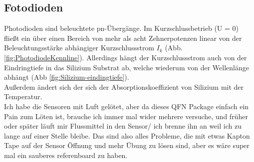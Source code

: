 
\subsection{Fotodioden}
Photodioden sind beleuchtete pn-Übergänge. Im Kurzschlussbetrieb (U = 0) fließt ein über einen Bereich von mehr als acht Zehnerpotenzen linear von der Beleuchtungsstärke abhängiger Kurzschlussstrom $I_k$ (Abb. \ref{fig:PhotodiodeKennline}).
Allerdings hängt der Kurzschlussstrom auch von der Eindringtiefe in das Silizium Substrat ab, welche wiederum von der Wellenlänge abhängt (Abb \ref{fig:Silizium-eindingtiefe}).\\
Außerdem ändert sich der sich der Absorptionskoeffizient von Silizium mit der Temperatur. \\%





Ich habe die Sensoren mit Luft gelötet, aber da dieses QFN Package einfach ein Pain zum Löten ist, brauche ich immer mal wider mehrere versuche, und früher oder später läuft mir Flussmittel in den Sensor/ ich brenne ihn an weil ich zu lange auf einer Stelle bleibe.
Das sind also alles Probleme, die mit etwas Kapton Tape auf der Sensor Öffnung und mehr Übung zu lösen sind, aber es wäre super mal ein sauberes referenboard zu haben.

